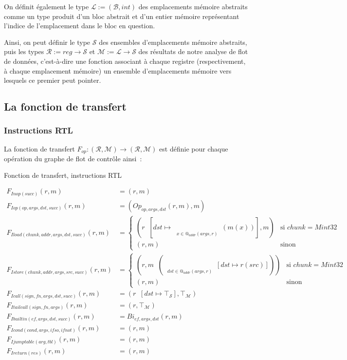\documentclass{article}
\makeatletter
\newcommand\mi{\mathit}
\newcommand\F[1]{F_{\mi{#1}}}
\newcommand\Op[1]{Op_{\mi{#1}}}
\newcommand\Bi[1]{Bi_{\mi{#1}}}
\newcommand\At[1]{@_{\mi{#1}}}
\newcommand\tB{\mathcal{B}}
\newcommand\tL{\mathcal{L}}
\newcommand\tS{\mathcal{S}}
\newcommand\tR{\mathcal{R}}
\newcommand\tM{\mathcal{M}}
\DeclareMathOperator*{\lubR}{{\sqcup}_\tR}
\DeclareMathOperator*{\lubM}{{\sqcup}_\tM}
\DeclareMathOperator*{\LUBS}{{\bigsqcup}_\tS}
\DeclareMathOperator*{\LUBM}{{\bigsqcup}_\tM}
\makeatother
\begin{document}
On définit également le type $\tL := (\tB, int)$ des emplacements mémoire
abstraits comme un type produit d'un bloc abstrait et d'un entier mémoire
représentant l'indice de l'emplacement dans le bloc en question.

Ainsi, on peut définir le type $\tS$ des ensembles d'emplacements mémoire
abstraits, puis les types $\mathcal{R} := reg \rightarrow \mathcal{S}$ et
$\mathcal{M} := \mathcal{L} \rightarrow \mathcal{S}$ des résultats de notre
analyse de flot de données, c'est-à-dire une fonction associant à chaque
registre (respectivement, à chaque emplacement mémoire) un ensemble
d'emplacements mémoire vers lesquels ce premier peut pointer.

\newpage
\subsection{La fonction de transfert}

\subsubsection*{Instructions RTL}

La fonction de transfert $F_{op}: (\tR, \tM) \rightarrow (\tR, \tM)$ est
définie pour chaque opération du graphe de flot de contrôle ainsi~:

\begin{formulae}
\caption{Fonction de transfert, instructions RTL}
\label{transf}
\begin{align*}
\F{Inop(succ)}(r, m) &= (r, m)
\\
\F{Iop(op, args, dst, succ)}(r, m) &= (\Op{op, args, dst}(r, m), m)
\\
\F{Iload(chunk, addr, args, dst, succ)}(r, m) &=
\begin{cases}
(r \lubR [\mi{dst} \mapsto
{\LUBM\limits_{\substack{x \in \At{addr}(\mi{args}, r)}}}
(m(x))], m) & \text{si } chunk = Mint32
\\
(r, m) & \text{sinon}
\end{cases}
\\
\F{Istore(chunk, addr, args, src, succ)}(r, m) &=
\begin{cases}
(r, m \lubM (
\LUBS\limits_{\substack{\mi{dst} \in @_{addr}(\mi{args}, r)}}
[\mi{dst} \mapsto r(\mi{src})]))
& \text{si } chunk = Mint32
\\
(r, m)
& \text{sinon}
\end{cases}
\\
\F{Icall(sign, fn, args, dst, succ)}(r, m) &=
(r \lubR [\mi{dst} \mapsto \top_\tS], \top_\tM)
\\
\F{Itailcall(sign, fn, args)}(r, m) &= (r, \top_\tM)
\\
\F{Ibuiltin(ef, args, dst, succ)}(r, m) &= \Bi{ef, args, dst}(r, m)
\\
\F{Icond(cond, args, ifso, ifnot)}(r, m) &= (r, m)
\\
\F{Ijumptable(arg, tbl)}(r, m) &= (r, m)
\\
\F{Ireturn(res)}(r, m) &= (r, m)
\end{align*}
\end{formulae}
\end{document}
